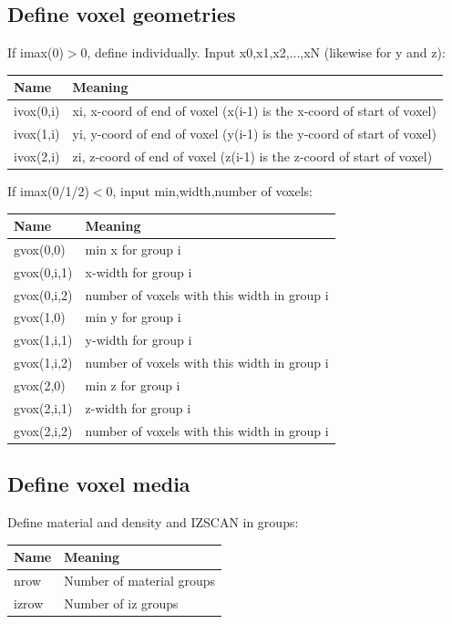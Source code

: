 \documentclass[12pt]{book}
\begin{document}
\newpage
\subsection{Define voxel geometries}

\noindent If imax(0)$>$0, define individually.  Input x0,x1,x2,...,xN
(likewise for y and z):

\begin{tabular} {|p{1.5in}|p{3.75in}|}
\hline
Name & Meaning \\ \hline
ivox(0,i) & xi, x-coord of end of voxel (x(i-1) is the x-coord of start
of voxel) \\
ivox(1,i) & yi, y-coord of end of voxel (y(i-1) is the y-coord of start
of voxel) \\
ivox(2,i) & zi, z-coord of end of voxel (z(i-1) is the z-coord of start
of voxel) \\ \hline
\end{tabular}

\noindent If imax(0/1/2)$<$0, input min,width,number of voxels:

\begin{tabular} {|p{1.5in}|p{3.75in}|}
\hline
Name & Meaning \\ \hline
gvox(0,0) & min x for group i \\
gvox(0,i,1) & x-width for group i \\
gvox(0,i,2) & number of voxels with this width in group i \\
gvox(1,0) & min y for group i \\
gvox(1,i,1) & y-width for group i \\
gvox(1,i,2) & number of voxels with this width in group i \\
gvox(2,0) & min z for group i \\
gvox(2,i,1) & z-width for group i \\
gvox(2,i,2) & number of voxels with this width in group i \\ \hline
\end{tabular}

\subsection{Define voxel media}

\noindent Define material and density and IZSCAN in groups:

\begin{tabular} {|p{1.5in}|p{3.75in}|}
\hline
Name & Meaning \\ \hline
nrow & Number of material groups \\
izrow & Number of iz groups \\ \hline
\end{tabular}
\end{document}
